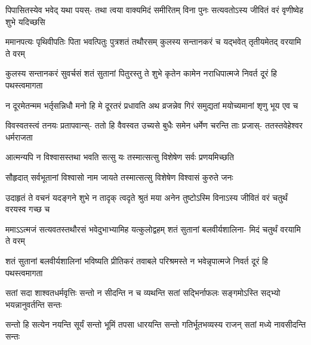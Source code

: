 \begin{center}

\fourlineindentedshloka
{पिपासितस्येव भवेद् यथा पयस्-}
{तथा त्वया वाक्यमिदं समीरितम्}
{विना पुनः सत्यवतोऽस्य जीवितं}
{वरं वृणीष्वेह शुभे यदिच्छसि}


\fourlineindentedshloka
{ममानपत्यः पृथिवीपतिः पिता}
{भवत्पितुः पुत्रशतं तथौरसम्}
{कुलस्य सन्तानकरं च यद्भवेत्}
{तृतीयमेतद् वरयामि ते वरम्}


\fourlineindentedshloka
{कुलस्य सन्तानकरं सुवर्चसं}
{शतं सुतानां पितुरस्तु ते शुभे}
{कृतेन कामेन नराधिपात्मजे}
{निवर्त दूरं हि पथस्त्वमागता}


\fourlineindentedshloka
{न दूरमेतन्मम भर्तृसन्निधौ}
{मनो हि मे दूरतरं प्रधावति}
{अथ व्रजन्नेव गिरं समुद्यतां}
{मयोच्यमानां शृणु भूय एव च}

\fourlineindentedshloka
{विवस्वतस्त्वं तनयः प्रतापवान्स्-}
{ततो हि वैवस्वत उच्यसे बुधैः}
{समेन धर्मेण चरन्ति ताः प्रजास्-}
{ततस्तवेहेश्वर धर्मराजता}

\twolineshloka
{आत्मन्यपि न विश्वासस्तथा भवति सत्सु यः}
{तस्मात्सत्सु विशेषेण सर्वः प्रणयमिच्छति}

\twolineshloka
{सौहृदात् सर्वभूतानां विश्वासो नाम जायते}
{तस्मात्सत्सु विशेषेण विश्वासं कुरुते जनः}


\fourlineindentedshloka
{उदाहृतं ते वचनं यदङ्गने}
{शुभे न तादृक् त्वदृते श्रुतं मया}
{अनेन तुष्टोऽस्मि विनाऽस्य जीवितं}
{वरं चतुर्थं वरयस्व गच्छ च}


\fourlineindentedshloka
{ममाऽऽत्मजं सत्यवतस्तथौरसं}
{भवेदुभाभ्यामिह यत्कुलोद्वहम्}
{शतं सुतानां बलवीर्यशालिना-}
{मिदं चतुर्थं वरयामि ते वरम्}


\fourlineindentedshloka
{शतं सुतानां बलवीर्यशालिनां}
{भविष्यति प्रीतिकरं तवाबले}
{परिश्रमस्ते न भवेन्नृपात्मजे}
{निवर्त दूरं हि पथस्त्वमागता}


\fourlineindentedshloka
{सतां सदा शाश्वतधर्मवृत्तिः}
{सन्तो न सीदन्ति न च व्यथन्ति}
{सतां सद्भिर्नाफलः सङ्गमोऽस्ति}
{सद्भ्यो भयन्नानुवर्तन्ति सन्तः}

\fourlineindentedshloka
{सन्तो हि सत्येन नयन्ति सूर्यं}
{सन्तो भूमिं तपसा धारयन्ति}
{सन्तो गतिर्भूतभव्यस्य राजन्}
{सतां मध्ये नावसीदन्ति सन्तः}


\end{center}
